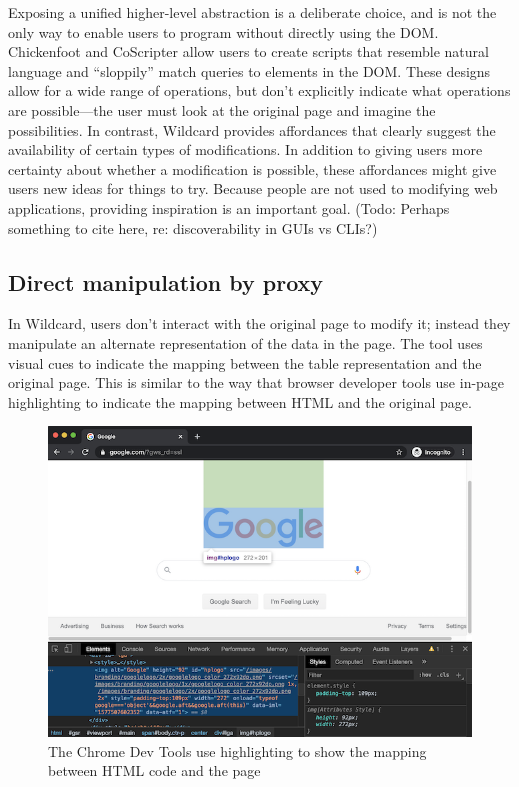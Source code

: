\documentclass[english,submission]{programming}
\begin{document}
Exposing a unified higher-level abstraction is a deliberate choice, and
is not the only way to enable users to program without directly using
the DOM. Chickenfoot \autocite{bolin2005} and CoScripter
\autocite{leshed2008} allow users to create scripts that resemble
natural language and ``sloppily'' match queries to elements in the DOM.
These designs allow for a wide range of operations, but don't explicitly
indicate what operations are possible---the user must look at the
original page and imagine the possibilities. In contrast, Wildcard
provides affordances that clearly suggest the availability of certain
types of modifications. In addition to giving users more certainty about
whether a modification is possible, these affordances might give users
new ideas for things to try. Because people are not used to modifying
web applications, providing inspiration is an important goal. (Todo:
Perhaps something to cite here, re: discoverability in GUIs vs CLIs?)

\hypertarget{direct-manipulation-by-proxy}{%
\subsection{Direct manipulation by
proxy}\label{direct-manipulation-by-proxy}}

In Wildcard, users don't interact with the original page to modify it;
instead they manipulate an alternate representation of the data in the
page. The tool uses visual cues to indicate the mapping between the
table representation and the original page. This is similar to the way
that browser developer tools use in-page highlighting to indicate the
mapping between HTML and the original page.

\begin{figure}
\hypertarget{fig:devtools}{%
\centering
\includegraphics{media/devtools.png}
\caption{The Chrome Dev Tools use highlighting to show the mapping
between HTML code and the page}\label{fig:devtools}
}
\end{figure}
\end{document}
